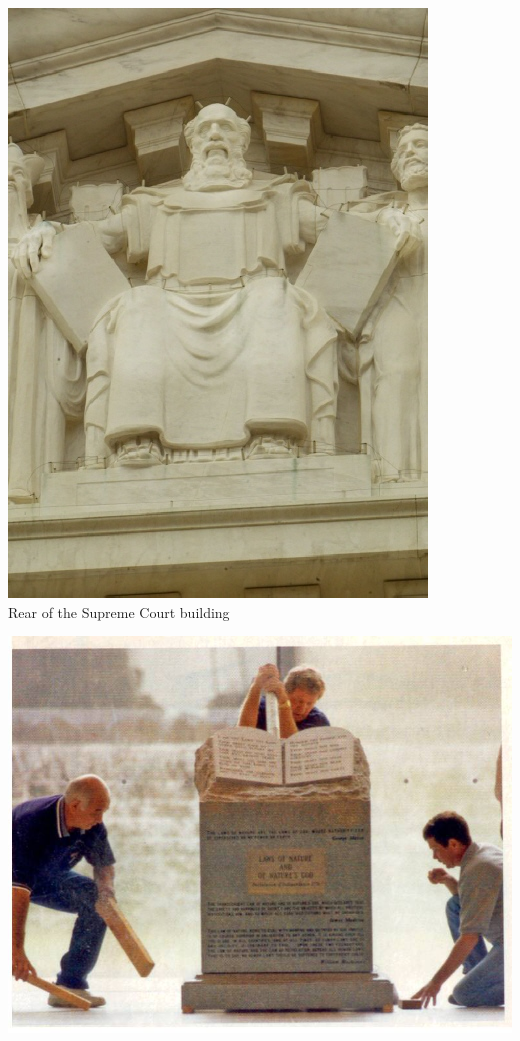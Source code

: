 \begin{frame}
    \centering
    \includegraphics[height=.9\textheight]{img/moses_east_supcourt.jpg} \\
    \large{ Rear of the Supreme Court building } \\
\end{frame}

\begin{frame}
    \centering
    \includegraphics[width=.9\textwidth]{img/10-commandments.jpg} \\
\end{frame}

